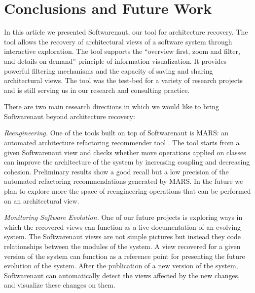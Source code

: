\documentclass[preprint,12pt]{elsarticle}
\begin{document}





\section {Conclusions and Future Work}
\label {sec:conc}

In this article we presented Softwarenaut, our tool for architecture recovery. The tool allows the recovery of architectural views of a software system through interactive exploration. The tool supports the ``overview first, zoom and filter, and details on demand'' principle of information visualization. It provides powerful filtering mechanisms and the capacity of saving and sharing architectural views. The tool was the test-bed for a variety of research projects and is still serving us in our research and consulting practice. 

There are two main research directions in which we would like to bring Softwarenaut beyond architecture recovery:

\begin{description}

\item {\em Reengineering.}
One of the tools built on top of Softwarenaut is MARS: an automated architecture refactoring recommender tool \cite{boeckmann-mars}. The tool starts from a given Softwarenaut view and checks whether move operations applied on classes can improve the architecture of the system by increasing coupling and decreasing cohesion. Preliminary results show a good recall but a low precision of the  automated refactoring recommendations generated by MARS. In the future we plan to explore more the space of reengineering operations that can be performed on an architectural view.


\item {\em Monitoring Software Evolution.}
One of our future projects is exploring ways in which the recovered views can function as a live documentation of an evolving system. The Softwarenaut views are not simple pictures but instead they code relationships between the modules of the system. A view recovered for a given version of the system can function as a reference point for presenting the future evolution of the system. After the publication of a new version of the system, Softwarenaut can automatically detect the views affected by the new changes, and visualize these changes on them.

\end{description}
\end{document}
